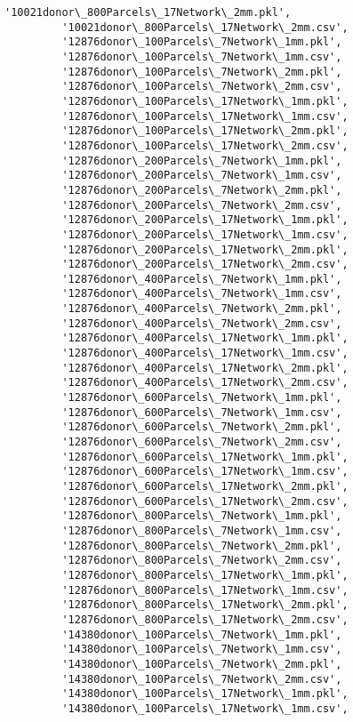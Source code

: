 \documentclass[11pt]{article}
\begin{document}
\begin{Verbatim}[commandchars=\\\{\}]
         '10021donor\_800Parcels\_17Network\_2mm.pkl',
         '10021donor\_800Parcels\_17Network\_2mm.csv',
         '12876donor\_100Parcels\_7Network\_1mm.pkl',
         '12876donor\_100Parcels\_7Network\_1mm.csv',
         '12876donor\_100Parcels\_7Network\_2mm.pkl',
         '12876donor\_100Parcels\_7Network\_2mm.csv',
         '12876donor\_100Parcels\_17Network\_1mm.pkl',
         '12876donor\_100Parcels\_17Network\_1mm.csv',
         '12876donor\_100Parcels\_17Network\_2mm.pkl',
         '12876donor\_100Parcels\_17Network\_2mm.csv',
         '12876donor\_200Parcels\_7Network\_1mm.pkl',
         '12876donor\_200Parcels\_7Network\_1mm.csv',
         '12876donor\_200Parcels\_7Network\_2mm.pkl',
         '12876donor\_200Parcels\_7Network\_2mm.csv',
         '12876donor\_200Parcels\_17Network\_1mm.pkl',
         '12876donor\_200Parcels\_17Network\_1mm.csv',
         '12876donor\_200Parcels\_17Network\_2mm.pkl',
         '12876donor\_200Parcels\_17Network\_2mm.csv',
         '12876donor\_400Parcels\_7Network\_1mm.pkl',
         '12876donor\_400Parcels\_7Network\_1mm.csv',
         '12876donor\_400Parcels\_7Network\_2mm.pkl',
         '12876donor\_400Parcels\_7Network\_2mm.csv',
         '12876donor\_400Parcels\_17Network\_1mm.pkl',
         '12876donor\_400Parcels\_17Network\_1mm.csv',
         '12876donor\_400Parcels\_17Network\_2mm.pkl',
         '12876donor\_400Parcels\_17Network\_2mm.csv',
         '12876donor\_600Parcels\_7Network\_1mm.pkl',
         '12876donor\_600Parcels\_7Network\_1mm.csv',
         '12876donor\_600Parcels\_7Network\_2mm.pkl',
         '12876donor\_600Parcels\_7Network\_2mm.csv',
         '12876donor\_600Parcels\_17Network\_1mm.pkl',
         '12876donor\_600Parcels\_17Network\_1mm.csv',
         '12876donor\_600Parcels\_17Network\_2mm.pkl',
         '12876donor\_600Parcels\_17Network\_2mm.csv',
         '12876donor\_800Parcels\_7Network\_1mm.pkl',
         '12876donor\_800Parcels\_7Network\_1mm.csv',
         '12876donor\_800Parcels\_7Network\_2mm.pkl',
         '12876donor\_800Parcels\_7Network\_2mm.csv',
         '12876donor\_800Parcels\_17Network\_1mm.pkl',
         '12876donor\_800Parcels\_17Network\_1mm.csv',
         '12876donor\_800Parcels\_17Network\_2mm.pkl',
         '12876donor\_800Parcels\_17Network\_2mm.csv',
         '14380donor\_100Parcels\_7Network\_1mm.pkl',
         '14380donor\_100Parcels\_7Network\_1mm.csv',
         '14380donor\_100Parcels\_7Network\_2mm.pkl',
         '14380donor\_100Parcels\_7Network\_2mm.csv',
         '14380donor\_100Parcels\_17Network\_1mm.pkl',
         '14380donor\_100Parcels\_17Network\_1mm.csv',

\end{Verbatim}
\end{document}
